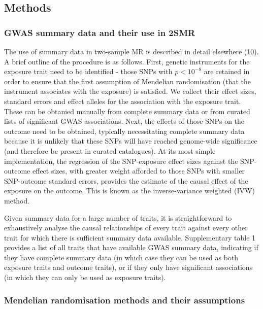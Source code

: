 \documentclass[]{article}
\begin{document}
\subsection{Methods}\label{methods}

\subsubsection{GWAS summary data and their use in
2SMR}\label{gwas-summary-data-and-their-use-in-2smr}

The use of summary data in two-sample MR is described in detail
elsewhere (10). A brief outline of the procedure is as follows. First,
genetic instruments for the exposure trait need to be identified - those
SNPs with \(p < 10^{-8}\) are retained in order to ensure that the first
assumption of Mendelian randomisation (that the instrument associates
with the exposure) is satisfied. We collect their effect sizes, standard
errors and effect alleles for the association with the exposure trait.
These can be obtanied manually from complete summary data or from
curated lists of significant GWAS associations. Next, the effects of
those SNPs on the outcome need to be obtained, typically necessitating
complete summary data because it is unlikely that these SNPs will have
reached genome-wide significance (and therefore be present in curated
catalogues). At its most simple implementation, the regression of the
SNP-exposure effect sizes against the SNP-outcome effect sizes, with
greater weight afforded to those SNPs with smaller SNP-outcome standard
errors, provides the estimate of the causal effect of the exposure on
the outcome. This is known as the inverse-variance weighted (IVW)
method.

Given summary data for a large number of traits, it is straightforward
to exhaustively analyse the causal relationships of every trait against
every other trait for which there is sufficient summary data available.
Supplementary table 1 provides a list of all traits that have available
GWAS summary data, indicating if they have complete summary data (in
which case they can be used as both exposure traits and outcome traits),
or if they only have significant associations (in which they can only be
used as exposure traits).

\subsubsection{Mendelian randomisation methods and their
assumptions}\label{mendelian-randomisation-methods-and-their-assumptions}
\end{document}

